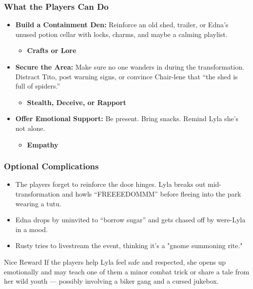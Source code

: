 \subsubsection*{What the Players Can Do}
\begin{itemize}
    \item \textbf{Build a Containment Den:} Reinforce an old shed, trailer, or Edna’s unused potion cellar with locks, charms, and maybe a calming playlist.
        \begin{itemize}
            \item \textbf{Crafts or Lore} 
        \end{itemize}
    \item \textbf{Secure the Area:} Make sure no one wanders in during the transformation. Distract Tito, post warning signs, or convince Chair-lene that “the shed is full of spiders.”
        \begin{itemize}
            \item \textbf{Stealth, Deceive, or Rapport} 
        \end{itemize}
    \item \textbf{Offer Emotional Support:} Be present. Bring snacks. Remind Lyla she’s not alone.
        \begin{itemize}
            \item \textbf{Empathy} 
        \end{itemize}
\end{itemize}

\subsubsection*{Optional Complications}
\begin{itemize}
    \item The players forget to reinforce the door hinges. Lyla breaks out mid-transformation and howls “FREEEEDOMMM” before fleeing into the park wearing a tutu.
    \item Edna drops by uninvited to “borrow sugar” and gets chased off by were-Lyla in a mood.
    \item Rusty tries to livestream the event, thinking it’s a "gnome summoning rite."
\end{itemize}

\begin{CommentBox}{Nice Reward}
    If the players help Lyla feel safe and respected, she opens up emotionally and may teach one of them a minor combat trick or share a tale from her wild youth — possibly involving a biker gang and a cursed jukebox.
\end{CommentBox}




